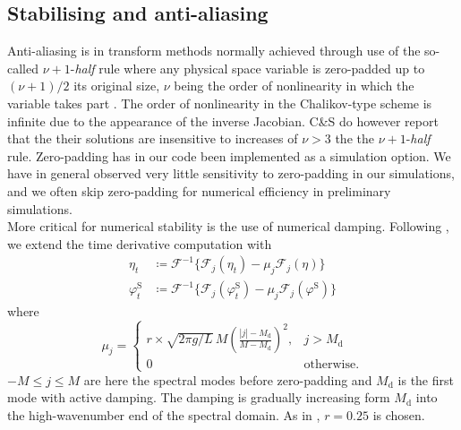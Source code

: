 \documentclass[a4paper,12pt]{article}
\newcommand{\mr}{\mathrm}
\newcommand{\mc}{\mathcal}
\renewcommand{\S}{^\mr{S}}
\renewcommand{\_}[1]{_\mr{#1}}
\newcommand{\rbr}[1]{\left(#1\right)}
\newcommand{\refCS}{C\&S}
\newcommand{\FF}{\mc F}
\begin{document}
\subsection*{Stabilising and anti-aliasing}
Anti-aliasing is in transform methods \citep{orszag1970transform} normally achieved through use of the so-called $\nu+1$-\textit{half} rule where any physical space variable is zero-padded up to $(\nu+1)/2$ its original size, $\nu$ being the order of nonlinearity in which the variable takes part \citep{bonnefoy2010}.
The order of nonlinearity in the Chalikov-type scheme is infinite due to the appearance of the inverse Jacobian. \refCS{} do however report that the their solutions are insensitive to increases of $\nu>3$ the the $\nu+1$-\textit{half} rule.
Zero-padding has in our code been implemented as a simulation option.
We have in general observed very little sensitivity to zero-padding in our simulations, and we often skip zero-padding for numerical efficiency in preliminary simulations.
\\


More critical for numerical stability is the use of numerical damping.
Following \citet{chalikov2005modeling}, we extend the time derivative computation with
\begin{subequations}
\begin{align}
\eta_t &\coloneqq \FF^{-1}\{\FF_j(\eta_t) - \mu_j \FF_j(\eta) \}\\
\varphi\S_t &\coloneqq  \FF^{-1}\{\FF_j(\varphi\S_t) - \mu_j \FF_j(\varphi\S) \}
\end{align}%
\label{eq:damping}%
\end{subequations}
where 
\begin{equation}
\mu_j = \begin{cases}
r\times  \sqrt{ 2\pi g/L}\,M\rbr{\frac{|j|-M\_d}{M-M\_d}}^2,& j>M\_d\\
0 & \text{otherwise.}
\end{cases}
\label{eq:damping_nu}
\end{equation}
$-M\leq j \leq M$ are here the spectral modes before zero-padding and $M\_d$ is the first mode with active damping.
The damping is gradually increasing form $M\_d$ into the high-wavenumber end of the spectral domain.
As in \citet{chalikov2005modeling}, $r=0.25$ is chosen.
\end{document}
